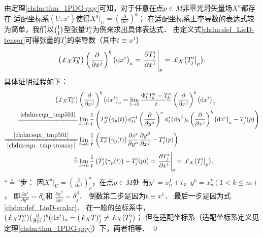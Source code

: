 由定理\ref{chdm:thm_1PDG-ppy}可知，对于任意在点$p\in M$非零光滑矢量场$X^a$都存在
{\kaishu 适配坐标系}$(U;x^i)$使得$X^a |_U = (\frac{\partial }{\partial x^1} )^a$；
在适配坐标系上李导数的表达式较为简单，我们以$\binom{1}{1}$型张量$T_b^a$为例来求出具体表达式．
由定义式\eqref{chdm:def_LieD-tensor}可得张量的$T_{j}^{i}$的李导数（其中$t\equiv x^1$）
\begin{equation}\label{chdm:eqn_LieD-adaptedX}
    \bigl( \Lie_{X} T_{b}^{a} \bigr)
    \left(\frac{\partial }{\partial x^{j}}\right)^{b} \left({\rm d}x^i \right)_a
    = \left. \frac{\partial T_{j}^{i}}{\partial x^1 } \right|_{p} 
    =\left. \Lie_{X} \bigl(T_{j}^{i} \right|_{p} \bigr) .
\end{equation}
具体证明过程如下：
\begin{align*}
    \bigl( \Lie_{X} T_{b}^{a} \bigr)&
    \left(\frac{\partial }{\partial x^{j}}\right)^{b} \left({\rm d}x^i \right)_a
    = \lim_{t\to 0} \frac{\Phi^{*}_{t} T_{b}^{a}-T_{b}^{a}}{t}  
    \left(\frac{\partial }{\partial x^{j}}\right)^{b} \left({\rm d}x^i \right)_a \\
     \xlongequal{\ref{chdm:eqn_tmp501}}&  \lim_{t\to 0} \frac{1}{t}\left( 
        T^{\alpha}_{\beta}\bigl(\gamma_p(t)\bigr) \phi_{t*} ^{-1} 
         \left(\frac{\partial }{\partial y^{\alpha}}\right)^{a}
          \phi_{t}^{*}({\rm d}y^{\beta})_{b}  
          \left(\frac{\partial }{\partial x^{j}}\right)^{b} \left({\rm d}x^i \right)_a
           -T_{j}^{i}(p) \right) \\
    \xlongequal[\ref{chdm:eqn_tmp-transxy}]{\ref{chdm:eqn_tmp501}}&
    \lim_{t\to 0} \frac{1}{t}\left( T^{\alpha}_{\beta}\bigl(\gamma_p(t)\bigr) 
    \frac{\partial x^i}{\partial y^{\alpha}} \frac{\partial y^\beta}{\partial x^{j}}
    -T_{j}^{i}(p) \right) \\
    \overset{*}{=}&  \lim_{t\to 0} \frac{1}{t}\left( T_{j}^{i}\bigl(\gamma_p(t)\bigr)   -T_{j}^{i}(p) \right) 
    = \left. \frac{\partial T_{j}^{i}}{\partial x^1 } \right|_{p} 
    =\left. \Lie_{X} \bigl(T_{j}^{i} \right|_{p} \bigr) .
\end{align*}
“$\overset{*}{=}$”步：
因$X^a |_U = (\frac{\partial }{\partial x^1} )^a_p$，在点$p\in M$处
有$y^1=x^1_p+t$，$y^k =x^k_p (1< k \leqslant m)$，
即$\frac{\partial x^i}{\partial y^{\alpha}}=\delta^i_\alpha$和
$\frac{\partial y^\beta}{\partial x^{j}}=\delta^\beta_j$．
倒数第二步是因为$t\equiv x^1$．
最后一步是因为式\eqref{chdm:def_LieD-scalar}．
在一般的坐标系中，$( \Lie_{X} T_{b}^{a} )
(\frac{\partial }{\partial x^{j}})^{b} ({\rm d}x^i )_a 
= ( \Lie_{X} T ) _{j}^{i} \neq  \Lie_{X} (T  _{j}^{i})$；
但在适配坐标系（适配坐标系定义见定理\ref{chdm:thm_1PDG-ppy}）下，两者相等．
\qed


